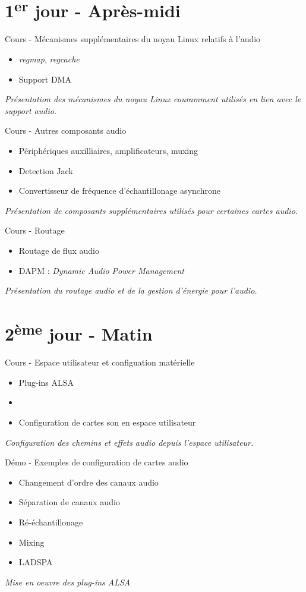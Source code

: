 \documentclass[a4paper,12pt,obeyspaces,spaces,hyphens]{article}
\begin{document}
\section{1\textsuperscript{er} jour - Après-midi}

\feagendatwocolumn
{Cours - Mécanismes supplémentaires du noyau Linux relatifs à l'audio}
{
  \begin{itemize}
  \item {\em regmap}, {\em regcache}
  \item Support DMA
  \end{itemize}
  \vspace{0.5em}
  {\em Présentation des mécanismes du noyau Linux couramment utilisés en lien avec le support audio.}
}
{Cours - Autres composants audio}
{
  \begin{itemize}
  \item Périphériques auxilliaires, amplificateurs, muxing
  \item Detection Jack
  \item Convertisseur de fréquence d'échantillonage asynchrone
  \end{itemize}
  \vspace{0.5em}
  {\em Présentation de composants supplémentaires utilisés pour certaines cartes audio.}
}

\feagendaonecolumn
{Cours - Routage}
{
  \begin{itemize}
  \item Routage de flux audio
  \item DAPM : {\em Dynamic Audio Power Management}
  \end{itemize}
  \vspace{0.5em}
  {\em Présentation du routage audio et de la gestion d'énergie pour l'audio.}
}

\section{2\textsuperscript{ème} jour - Matin}

\feagendatwocolumn
{Cours - Espace utilisateur et configuation matérielle}
{
  \begin{itemize}
  \item Plug-ins ALSA
  \item {}
  \item Configuration de cartes son en espace utilisateur
  \end{itemize}
  \vspace{0.5em}
  {\em Configuration des chemins et effets audio depuis l'espace utilisateur.}
}
{Démo - Exemples de configuration de cartes audio}
{
  \begin{itemize}
  \item Changement d'ordre des canaux audio
  \item Séparation de canaux audio
  \item Ré-échantillonage
  \item Mixing
  \item LADSPA
  \end{itemize}
  \vspace{0.5em}
  {\em Mise en oeuvre des plug-ins ALSA}
}
\end{document}
